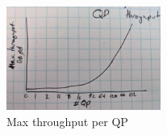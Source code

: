 \begin{figure}[t]
    \includegraphics[width=0.45\textwidth]{fig/qp_bottleneck.jpg}
    \caption{Max throughput per QP }
    \label{fig:qp_bottleneck}
\end{figure}

 





